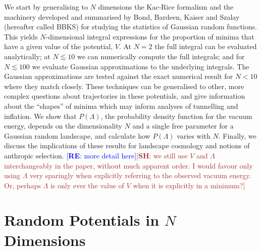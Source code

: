 \documentclass[12pt]{article}
\newcommand{\re}[1]{\textcolor{blue}{[{\bf RE}: #1]}}
\newcommand{\SH}[1]{\textcolor{brown}{[{\bf SH}: #1]}}
\newcommand{\sh}[1]{\textcolor{brown}{#1}}
\begin{document}
We start by generalising to $N$ dimensions the Kac-Rice formalism \cite{Kac1943,Rice1945} and the  machinery developed and summarised by Bond, Bardeen, Kaiser and Szalay  \cite{BBKS} (hereafter called BBKS) for studying the statistics of Gaussian random functions. This yields $N$-dimensional integral expressions for the proportion of minima that have a given value of the potential, $V$. At $N=2$ the full integral can be evaluated analytically; at $N \lesssim 10$ we can numerically compute the full integrals; and for $N \lesssim 100$ we evaluate Gaussian approximations to the underlying integrals. The Gaussian approximations are tested against the exact numerical result for $N <10$ where they match closely. These techniques can be generalised to other, more complex questions about trajectories in these potentials, and give information about the ``shapes'' of minima which may inform analyses of tunnelling and inflation. We show that $P(\Lambda)$, the probability density function for the vacuum energy, depends on the dimensionality $N$ and a single free parameter for a Gaussian random landscape, and calculate how $P(\Lambda)$ varies with $N$. Finally, we discuss the implications of these results for landscape cosmology and notions of anthropic selection. \re{more detail here}\SH{we still use $V$ and $\Lambda$ interchangeably in the paper, without much apparent order. I would favour only using $\Lambda$ very sparingly when explicitly referring to the observed vacuum energy. Or, perhaps $\Lambda$ is only ever the value of $V$ when it is explicitly in a minimum?}

\section{Random Potentials in $N$ Dimensions}

\end{document}
